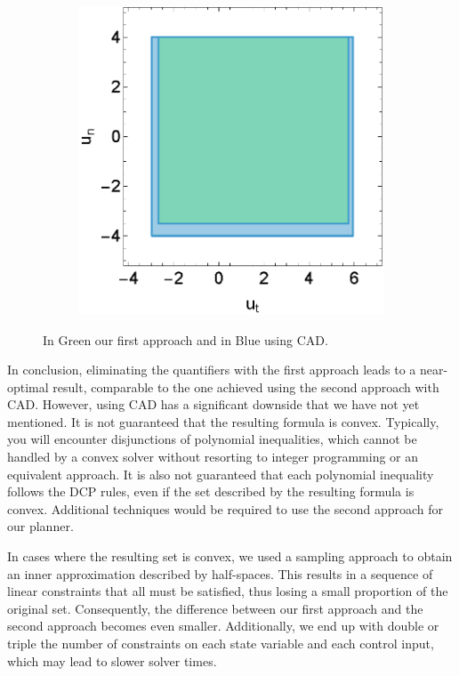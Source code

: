 \begin{figure}[h]
\begin{subfigure}[b]{0.32\textwidth}
	\end{subfigure}
	\begin{subfigure}[b]{0.32\textwidth}
		\centering
		\includegraphics[width=\textwidth]{figures/inner_polytope/region_u1u2_plot_gr1.eps}
	\end{subfigure}
	\caption{In Green our first approach and in Blue using CAD.}
	\label{fig:qe-comparison}
\end{figure}

In conclusion, eliminating the quantifiers with the first approach leads to a near-optimal result, comparable to the one achieved using the second
approach with CAD.
However, using CAD has a significant downside that we have not yet mentioned.
It is not guaranteed that the resulting formula is convex.
Typically, you will encounter disjunctions of polynomial inequalities, which cannot be handled by a convex solver without resorting to integer
programming or an equivalent approach.
It is also not guaranteed that each polynomial inequality follows the DCP rules, even if the set described by the resulting formula is convex.
Additional techniques would be required to use the second approach for our planner.

In cases where the resulting set is convex, we used a sampling approach to obtain an inner approximation described by half-spaces.
This results in a sequence of linear constraints that all must be satisfied, thus losing a small proportion of the original set.
Consequently, the difference between our first approach and the second approach becomes even smaller.
Additionally, we end up with double or triple the number of constraints on each state variable and each control input, which may lead to slower
solver times.

